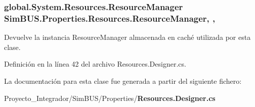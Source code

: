 \subsubsection[{Resource\-Manager}]{\setlength{\rightskip}{0pt plus 5cm}global.\-System.\-Resources.\-Resource\-Manager Sim\-B\-U\-S.\-Properties.\-Resources.\-Resource\-Manager\hspace{0.3cm}{\ttfamily [static]}, {\ttfamily [get]}, {\ttfamily [package]}}\label{class_sim_b_u_s_1_1_properties_1_1_resources_a57c5fdb8bc37c8101109a8ac03628e9e}


Devuelve la instancia Resource\-Manager almacenada en caché utilizada por esta clase. 



Definición en la línea 42 del archivo Resources.\-Designer.\-cs.



La documentación para esta clase fue generada a partir del siguiente fichero\-:\begin{DoxyCompactItemize}
\item 
Proyecto\-\_\-\-Integrador/\-Sim\-B\-U\-S/\-Properties/{\bf Resources.\-Designer.\-cs}\end{DoxyCompactItemize}
